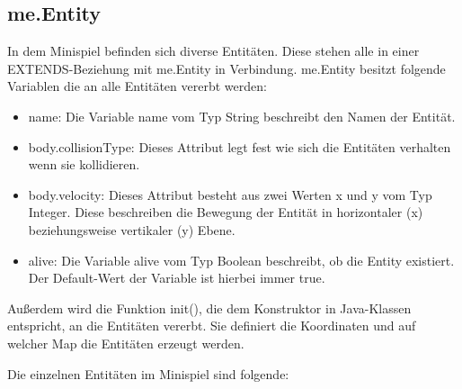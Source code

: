 \subsection{me.Entity}
\label{Entity}
In dem Minispiel befinden sich diverse Entit\"aten. Diese stehen alle in einer EXTENDS-Beziehung mit me.Entity in Verbindung.
me.Entity besitzt folgende Variablen die an alle Entit\"aten vererbt werden:
\begin{itemize} 
	\item name: Die Variable name vom Typ String beschreibt den Namen der Entit\"at.
	\item body.collisionType: Dieses Attribut legt fest wie sich die Entit\"aten verhalten wenn sie kollidieren.
	\item body.velocity: Dieses Attribut besteht aus zwei Werten x und  y vom Typ Integer. Diese beschreiben die Bewegung der Entit\"at in horizontaler (x) 
		beziehungsweise vertikaler (y) Ebene.
 	\item alive: Die Variable alive vom Typ Boolean beschreibt, ob die Entity existiert. Der Default-Wert der Variable ist hierbei immer true.
\end{itemize}    

Au{\ss}erdem wird die Funktion init(), die dem Konstruktor in Java-Klassen entspricht, an die Entit\"aten vererbt. Sie definiert die Koordinaten und auf welcher Map
die Entit\"aten erzeugt werden.
  
Die einzelnen Entit\"aten im Minispiel sind folgende:

\newpage
